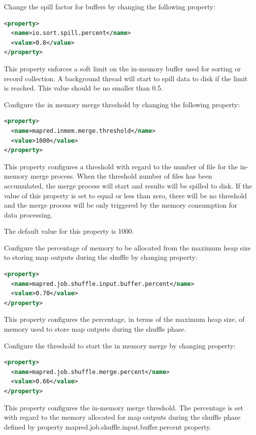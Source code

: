 Change the spill factor for buffers by changing the following property:
\lstset{style=bashstyle}
\begin{lstlisting}[language=XML]
<property>
  <name>io.sort.spill.percent</name>
  <value>0.8</value>
</property>
\end{lstlisting}
This property enforces a soft limit on the in-memory buffer used for sorting or record collection. A background thread will start to spill data to disk if the limit is reached. This value should be no smaller than 0.5.

Configure the in memory merge threshold by changing the following property:
\lstset{style=bashstyle}
\begin{lstlisting}[language=XML]
<property>
  <name>mapred.inmem.merge.threshold</name>
  <value>1000</value>
</property>
\end{lstlisting}
This property configures a threshold with regard to the number of file for the in-memory merge process. When the threshold number of files has been accumulated, the merge process will start and results will be spilled to disk. If the value of this property is set to equal or less than zero, there will be no threshold and the merge process will be only triggered by the memory consumption for data processing.

\begin{info}The default value for this property is 1000.\end{info}

Configure the percentage of memory to be allocated from the maximum heap size to storing map outputs during the shuffle by changing property:
\lstset{style=bashstyle}
\begin{lstlisting}[language=XML]
<property>
  <name>mapred.job.shuffle.input.buffer.percent</name>
  <value>0.70</value>
</property>
\end{lstlisting}

This property configures the percentage, in terms of the maximum heap size, of memory used to store map outputs during the shuffle phase.

Configure the threshold to start the in memory merge by changing property:
\lstset{style=bashstyle}
\begin{lstlisting}[language=XML]
<property>
  <name>mapred.job.shuffle.merge.percent</name>
  <value>0.66</value>
</property>
\end{lstlisting}

This property configures the in-memory merge threshold. The percentage is set with regard to the memory allocated for map outputs during the shuffle phase defined by property mapred.job.shuffle.input.buffer.percent property.


